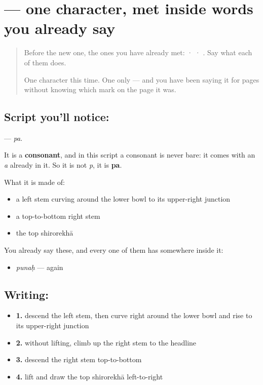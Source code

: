 \section[\texorpdfstring{\sk{प} (pa)}{प (pa)}]{ — one character, met inside words you already say}

\label{lesson:SA-S113-letter-pa}



\begin{quote}
Before the new one, the ones you have already met:  ·  · . Say what each of them does.

One character this time. One only — and you have been saying it for pages without knowing which mark on the page it was.
\end{quote}

\subsection*{Script you'll notice: }
\textbf{} — \emph{pa}.

It is a \textbf{consonant}, and in this script a consonant is never bare: it comes with an \emph{a} already in it. So it is not \emph{p}, it is \textbf{pa}.

What it is made of:

\begin{itemize}
\raggedright
  \item a left stem curving around the lower bowl to its upper-right junction
  \item a top-to-bottom right stem
  \item the top shirorekhā
\end{itemize}

You already say these, and every one of them has  somewhere inside it:

\begin{itemize}
\raggedright
  \item \textbf{} \emph{punaḥ} — again
\end{itemize}

\subsection*{Writing: }

\begin{itemize}
\raggedright
  \item \textbf{1.} descend the left stem, then curve right around the lower bowl and rise to its upper-right junction
  \item \textbf{2.} without lifting, climb up the right stem to the headline
  \item \textbf{3.} descend the right stem top-to-bottom
  \item \textbf{4.} lift and draw the top shirorekhā left-to-right
\end{itemize}

